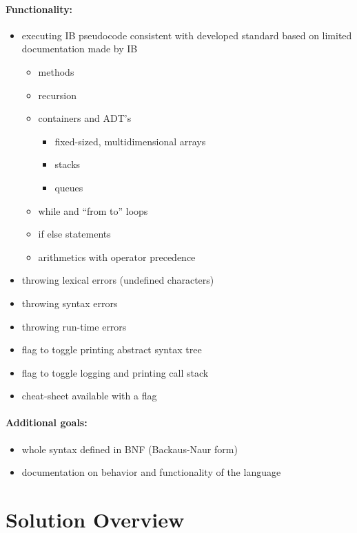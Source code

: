 \documentclass[12pt]{article}
\begin{document}
\paragraph{Functionality:}
\begin{itemize}
    \item executing IB pseudocode consistent with developed 
        standard based on limited documentation made by IB
        \begin{itemize}
            \item methods
            \item recursion
            \item containers and ADT's
                \begin{itemize}
                    \item fixed-sized, multidimensional arrays
                    \item stacks 
                    \item queues
                \end{itemize}
            \item while and ``from to'' loops
            \item if else statements
            \item arithmetics with operator precedence
        \end{itemize}
    \item throwing lexical errors (undefined characters)
    \item throwing syntax errors
    \item throwing run-time errors
    \item flag to toggle printing abstract syntax tree
    \item flag to toggle logging and printing call stack
    \item cheat-sheet available with a flag
\end{itemize}
\paragraph{Additional goals:}
\begin{itemize}
    \item whole syntax defined in BNF (Backaus-Naur form)
    \item documentation on behavior and functionality of the language
\end{itemize}

\section{Solution Overview}
\end{document}
